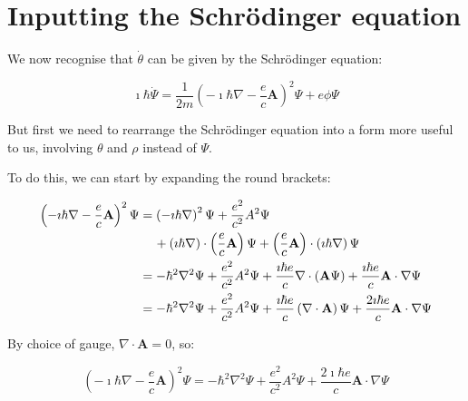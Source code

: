 
\section{Inputting the Schr\"odinger equation}
\label{sec:inputting}

We now recognise that $\dot \theta$ can be given by the Schr\"odinger equation:

\begin{equation}
    \imath \hbar \dot \Psi = \frac{1}{2m} \left(-\imath \hbar \nabla - \frac{e}{c}
    \mathbf{A} \right)^2 \Psi + e \phi \Psi
    \label{eqn:schroedinger}
\end{equation}

But first we need to rearrange the Schr\"odinger equation into a form more
useful to us, involving $\theta$ and $\rho$ instead of $\Psi$.

To do this, we can start by expanding the round brackets:

\begin{align}
    \left( - \imath \hbar \nabla - \frac{e}{c} \mathbf{A} \right)^2 \Psi &=
    \left( - \imath \hbar \nabla \right)^2 \Psi + \frac{e^2}{c^2} A^2 \Psi \\
    & \hspace{11.5pt} + \left( \imath \hbar \nabla \right) \cdot \left( \frac{e}{c} \mathbf{A}
    \right) \Psi + \left( \frac{e}{c} \mathbf{A} \right) \cdot \left( \imath \hbar \nabla
    \right)
    \Psi \\
    &= - \hbar^2 \nabla^2 \Psi + \frac{e^2}{c^2} A^2 \Psi + \frac{ \imath \hbar
    e}{c} \nabla \cdot \left( \mathbf{A} \Psi \right) + \frac{ \imath \hbar e}{c}
    \mathbf{A} \cdot \nabla \Psi \\
    &= - \hbar^2 \nabla^2 \Psi + \frac{e^2}{c^2} A^2 \Psi + \frac{ \imath \hbar
    e}{c} \left( \nabla \cdot \mathbf{A} \right) \Psi + \frac{ 2\imath \hbar e}{c}
    \mathbf{A} \cdot \nabla \Psi
\end{align}

By choice of gauge, $\nabla \cdot \mathbf{A} = 0$, so:

\begin{equation}
    \left( - \imath \hbar \nabla - \frac{e}{c} \mathbf{A} \right)^2 \Psi = -
    \hbar^2 \nabla^2 \Psi + \frac{e^2}{c^2} A^2 \Psi + \frac{2 \imath \hbar
    e}{c} \mathbf{A} \cdot \nabla \Psi
\end{equation}

